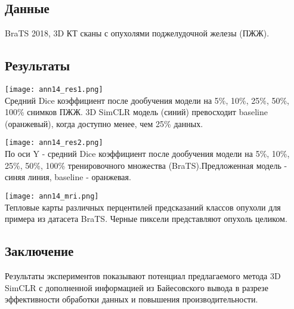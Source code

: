 \subsection*{Данные}
BraTS 2018, 3D КТ сканы с опухолями поджелудочной железы (ПЖЖ).
\subsection*{Результаты}

\begin{minipage}{0.49\linewidth}
    \begin{center}
        \texttt{[image: ann14\_res1.png]} \\
        \caption{\scriptsize{
            Средний Dice коэффициент после дообучения модели на 5\%,
            10\%, 25\%, 50\%, 100\% снимков ПЖЖ. 
            3D SimCLR модель (синий) превосходит baseline (оранжевый), когда доступно менее, чем 
            25\% данных.
        }}
    \end{center}
    
\end{minipage}
\begin{minipage}{0.49\linewidth}
    \begin{center}
        \texttt{[image: ann14\_res2.png]} \\
        \caption{\scriptsize{По оси Y - средний Dice коэффициент после дообучения модели на 5\%,
        10\%, 25\%, 50\%, 100\% тренировочного множества (BraTS).Предложенная 
        модель - синяя линия, baseline - оранжевая.}}
    \end{center}
    
\end{minipage} 


\begin{minipage}{1.0\linewidth}
    \begin{center}
        \texttt{[image: ann14\_mri.png]} \\
        \caption{\scriptsize{Тепловые карты различных перцентилей предсказаний классов опухоли 
        для примера из датасета BraTS. Черные пиксели представляют опухоль целиком.}}
    \end{center}
    
\end{minipage}
\newpage
\subsection*{Заключение}
Результаты экспериментов показывают потенциал предлагаемого метода 3D SimCLR с 
дополненной информацией из Байесовского вывода в разрезе эффективности 
обработки данных и повышения производительности. 